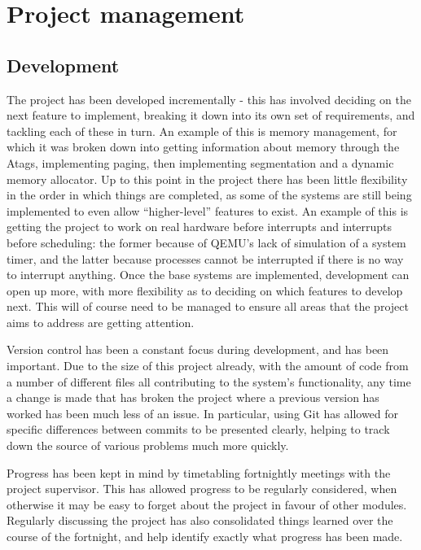 \documentclass[10pt,a4paper]{article}
\begin{document}
\section*{Project management}
\subsection*{Development}
The project has been developed incrementally - this has involved deciding on the
next feature to implement, breaking it down into its own set of requirements,
and tackling each of these in turn. An example of this is memory management, for
which it was broken down into getting information about memory through the
Atags, implementing paging, then implementing segmentation and a dynamic memory
allocator. Up to this point in the project there has been little flexibility
in the order in which things are completed, as some of the systems are still
being implemented to even allow ``higher-level'' features to exist. An example of
this is getting the project to work on real hardware before interrupts and
interrupts before scheduling: the former because of QEMU's lack of simulation of a
system timer, and the latter because processes cannot be interrupted if there is
no way to interrupt anything. Once the base systems are implemented, development
can open up more, with more flexibility as to deciding on which features to
develop next. This will of course need to be managed to ensure all areas that
the project aims to address are getting attention.

Version control has been a constant focus during development, and has been
important. Due to the size of this project already, with the amount of code from
a number of different files all contributing to the system's functionality, any
time a change is made that has broken the project where a previous version has
worked has been much less of an issue. In particular, using Git has allowed for
specific differences between commits to be presented clearly, helping to track
down the source of various problems much more quickly.

Progress has been kept in mind by timetabling fortnightly meetings with the
project supervisor. This has allowed progress to be regularly considered, when
otherwise it may be easy to forget about the project in favour of other modules.
Regularly discussing the project has also consolidated things learned over the
course of the fortnight, and help identify exactly what progress has been made.
\end{document}
